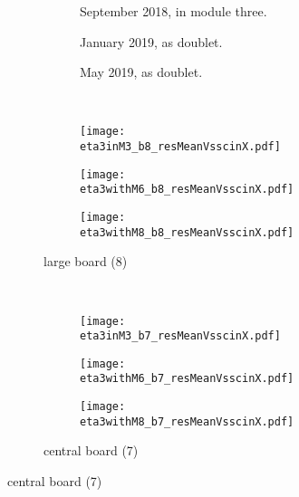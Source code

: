 \documentclass[
twoside,            %
BCOR1.4cm,          %
10pt,               %
headings=normal,    %
headsepline,        %
clearplainpage,		%
final,              %
div=14,
open=right,
bibliography=toc
]{scrreprt}
\begin{document}
\begin{figure}[!h]
	\begin{subfigure}[b]{\textwidth}
		\begin{subfigure}[b]{0.32\textwidth}
			\centering
			September 2018, in module three.
		\end{subfigure}
		\hfill
		\begin{subfigure}[b]{0.32\textwidth}
			\centering
			January 2019, as doublet.
		\end{subfigure}
		\hfill
		\begin{subfigure}[b]{0.32\textwidth}
			\centering
			May 2019, as doublet.
		\end{subfigure}
	\end{subfigure}
	\vspace{2mm}
	\\
	\begin{subfigure}[b]{\textwidth}
		\begin{subfigure}[b]{0.32\textwidth}
			\centering
			\texttt{[image: eta3inM3\_b8\_resMeanVsscinX.pdf]}
		\end{subfigure}
		\hfill
		\begin{subfigure}[b]{0.32\textwidth}
			\centering
			\texttt{[image: eta3withM6\_b8\_resMeanVsscinX.pdf]}
		\end{subfigure}
		\hfill
		\begin{subfigure}[b]{0.32\textwidth}
			\centering
			\texttt{[image: eta3withM8\_b8\_resMeanVsscinX.pdf]}
		\end{subfigure}
		\caption{
			large board (8)
		}
	\end{subfigure}
	\\
	\begin{subfigure}[b]{\textwidth}
		\begin{subfigure}[b]{0.32\textwidth}
			\centering
			\texttt{[image: eta3inM3\_b7\_resMeanVsscinX.pdf]}
		\end{subfigure}
		\hfill
		\begin{subfigure}[b]{0.32\textwidth}
			\centering
			\texttt{[image: eta3withM6\_b7\_resMeanVsscinX.pdf]}
		\end{subfigure}
		\hfill
		\begin{subfigure}[b]{0.32\textwidth}
			\centering
			\texttt{[image: eta3withM8\_b7\_resMeanVsscinX.pdf]}
		\end{subfigure}
		\caption{
			central board (7)
}
\end{subfigure}
\end{figure}
\end{document}
